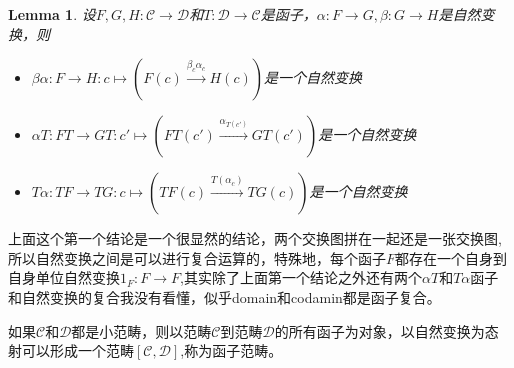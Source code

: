 \documentclass{article}
\newtheorem{lemma}[theorem]{Lemma}
\begin{document}
\pagebreak
\begin{lemma}
设$F,G,H \colon \mathcal{C} \rightarrow \mathcal{D}$和$T \colon \mathcal{D} \rightarrow \mathcal{C}$是函子，$\alpha \colon F \rightarrow G, \beta \colon G \rightarrow H$是自然变换，则
\begin{itemize}
 \item $\beta\alpha \colon F \rightarrow H \colon c \mapsto(F(c) \xrightarrow{\beta_c\alpha_c} H(c))$是一个自然变换
 \begin{center}
 \end{center}
	\item $\alpha T \colon FT \rightarrow GT \colon c' \mapsto (FT(c') \xrightarrow{\alpha_{T(c')}} GT(c'))$是一个自然变换
	\item $T\alpha \colon TF \rightarrow TG \colon c \mapsto (TF(c) \xrightarrow{T(\alpha_{c})} TG(c))$是一个自然变换
\end{itemize}
\end{lemma}


上面这个第一个结论是一个很显然的结论，两个交换图拼在一起还是一张交换图,所以自然变换之间是可以进行复合运算的，特殊地，每个函子$F$都存在一个自身到自身单位自然变换$1_F \colon F \rightarrow F$,其实除了上面第一个结论之外还有两个$\alpha T$和$T\alpha$函子和自然变换的复合我没有看懂，似乎domain和codamin都是函子复合。

如果$\mathcal{C}$和$\mathcal{D}$都是小范畴，则以范畴$\mathcal{C}$到范畴$\mathcal{D}$的所有函子为对象，以自然变换为态射可以形成一个范畴$[\mathcal{C},\mathcal{D}]$,称为$\textbf{函子范畴}$。
\end{document}
